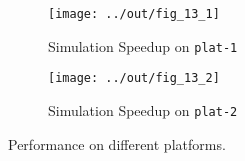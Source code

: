\documentclass{sig-alternate}
\begin{document}
\begin{figure*}[h!]
  \begin{subfigure}{\linewidth}
    \caption{Simulation Speedup on \texttt{plat-1}}
    \texttt{[image: ../out/fig\_13\_1]}
  \end{subfigure}
  \begin{subfigure}{\linewidth}
    \caption{Simulation Speedup on \texttt{plat-2}}
    \texttt{[image: ../out/fig\_13\_2]}
  \end{subfigure}
  \vspace*{-4mm}
  \caption{Performance on different platforms. }
  \label{fig:plat}
\end{figure*}
\end{document}
